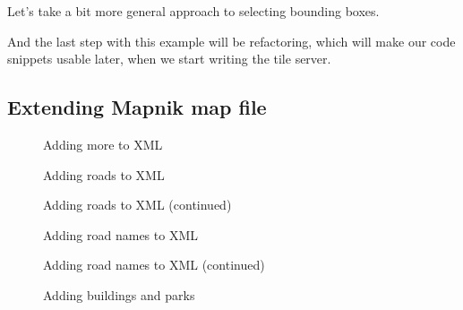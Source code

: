 \documentclass[letterpaper]{article}
\begin{document}
Let's take a bit more general approach to selecting bounding
boxes.

\begin{centering}
    
\end{centering}

And the last step with this example will be refactoring, which
will make our code snippets usable later, when we start writing
the tile server.

\begin{centering}
    
\end{centering}

\subsection{Extending Mapnik map file}
\label{sec:extending-mapnik-map}


\begin{figure}[h]
  \centering
  
  \caption{Adding more to XML}
  \label{fig:xml-more}
\end{figure}

\begin{figure}[h]
  \centering
  
  \caption{Adding roads to XML}
  \label{fig:xml-roads}
\end{figure}

\begin{figure}[h]
  \centering
  
  \caption{Adding roads to XML (continued)}
  \label{fig:xml-roads}
\end{figure}

\begin{figure}[h]
  \centering
  
  \caption{Adding road names to XML}
  \label{fig:xml-road-names}
\end{figure}

\begin{figure}[h]
  \centering
  
  \caption{Adding road names to XML (continued)}
  \label{fig:xml-road-names}
\end{figure}

\begin{figure}[h]
  \centering
  
  \caption{Adding buildings and parks}
  \label{fig:xml-polygons}
\end{figure}
\end{document}
